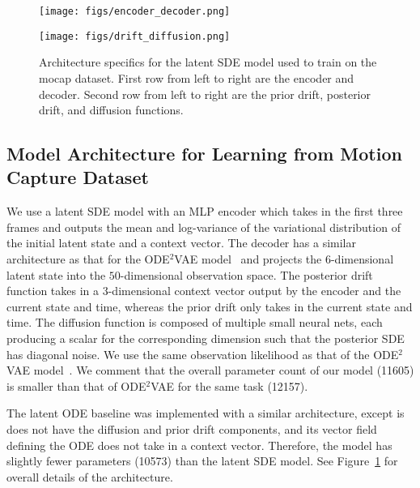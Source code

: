 \documentclass[twoside]{article}
\begin{document}
\begin{figure}[ht]
\begin{minipage}[t]{\linewidth}
\centering
{\texttt{[image: figs/encoder\_decoder.png]}}
\\ \vspace{-0.10cm}
\end{minipage}
\begin{minipage}[t]{\linewidth}
\centering
\texttt{[image: figs/drift\_diffusion.png]}
\\ \vspace{-0.10cm}
\end{minipage}
\caption{
Architecture specifics for the latent SDE model used to train on the mocap dataset.
First row from left to right are the encoder and decoder. 
Second row from left to right are the prior drift, posterior drift, and diffusion functions.
}
\label{fig:architecture}
\end{figure}

\subsection{Model Architecture for Learning from Motion Capture Dataset}\label{app:architecture}
We use a latent SDE model with an MLP encoder which takes in the first three frames and outputs the mean and log-variance of the variational distribution of the initial latent state and a context vector. 
The decoder has a similar architecture as that for the ODE$^2$VAE model~\cite{yildiz2019ode} and projects the $6$-dimensional latent state into the $50$-dimensional observation space. 
The posterior drift function takes in a $3$-dimensional context vector output by the encoder and the current state and time, whereas the prior drift only takes in the current state and time. 
The diffusion function is composed of multiple small neural nets, each producing a scalar for the corresponding dimension such that the posterior SDE has diagonal noise. 
We use the same observation likelihood as that of the ODE$^2$VAE model~\cite{yildiz2019ode}.
We comment that the overall parameter count of our model (11605) is smaller than that of ODE$^2$VAE for the same task (12157).

The latent ODE baseline was implemented with a similar architecture, except is does not have the diffusion and prior drift components, and its vector field defining the ODE does not take in a context vector. Therefore, the model has slightly fewer parameters (10573) than the latent SDE model. See Figure~\ref{fig:architecture} for overall details of the architecture.
\end{document}
